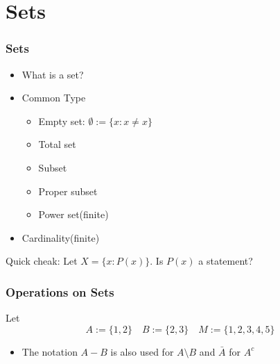 \documentclass{beamer}
\begin{document}
\section{Sets}
\begin{frame}
    \frametitle{Sets}
    \begin{itemize}
        \item What is a set?
        \item Common Type
        \begin{itemize}
            \item Empty set: $\emptyset := \{x:x\neq x\}$
            \item Total set
            \item Subset
            \item Proper subset
            \item Power set(finite)
        \end{itemize}   
        \item Cardinality(finite) 
    \end{itemize}
    \vspace*{1em}
    \begin{block}{
    Quick cheak:}
    \hspace{1em} 
    Let $X=\{x:P(x)\}.$  Is $P(x)$ a statement?
    \end{block}
\end{frame}
\begin{frame}
    \frametitle{Operations on Sets}
    Let
    \begin{equation*}
        A:=\{1,2\} \quad B:=\{2,3\} \quad M:=\{1,2,3,4,5\}
    \end{equation*}
    \begin{table}
        \centering
    \end{table}  
    \begin{itemize}
        \item The notation $A - B $ is also used for $A\setminus B$ and $\bar{A}$ for $A^c$
    \end{itemize}
\end{frame}
\end{document}
